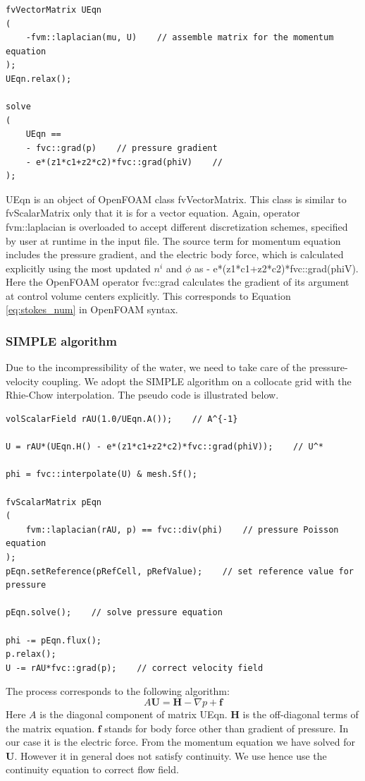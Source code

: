 \begin{lstlisting}
fvVectorMatrix UEqn
(
    -fvm::laplacian(mu, U)    // assemble matrix for the momentum equation
);
UEqn.relax();

solve
(
    UEqn == 
	- fvc::grad(p)    // pressure gradient 
	- e*(z1*c1+z2*c2)*fvc::grad(phiV)    //
);
\end{lstlisting}

\textsf{UEqn} is an object of OpenFOAM class \textsf{fvVectorMatrix}. This class is similar to \textsf{fvScalarMatrix} only that it is for a vector equation. Again, operator \textsf{fvm::laplacian} is overloaded to accept different discretization schemes, specified by user at runtime in the input file. The source term for momentum equation includes the pressure gradient, and the electric body force, which is calculated explicitly using the most updated $n^i$ and $\phi$ as \textsf{- e*(z1*c1+z2*c2)*fvc::grad(phiV)}. Here the OpenFOAM operator \textsf{fvc::grad} calculates the gradient of its argument at control volume centers explicitly. This corresponds to Equation \ref{eq:stokes_num} in OpenFOAM syntax.

\subsubsection{SIMPLE algorithm}
Due to the incompressibility of the water, we need to take care of the pressure-velocity coupling. We adopt the SIMPLE algorithm on a collocate grid with the Rhie-Chow interpolation. The pseudo code is illustrated below.

\begin{lstlisting}
volScalarField rAU(1.0/UEqn.A());    // A^{-1}

U = rAU*(UEqn.H() - e*(z1*c1+z2*c2)*fvc::grad(phiV));    // U^*
    
phi = fvc::interpolate(U) & mesh.Sf();    

fvScalarMatrix pEqn
(
    fvm::laplacian(rAU, p) == fvc::div(phi)    // pressure Poisson equation
);
pEqn.setReference(pRefCell, pRefValue);    // set reference value for pressure

pEqn.solve();    // solve pressure equation

phi -= pEqn.flux();
p.relax();
U -= rAU*fvc::grad(p);    // correct velocity field
\end{lstlisting}

The process corresponds to the following algorithm:
\begin{equation}
A \mathbf{U} = \mathbf{H} - \nabla p + \mathbf{f}
\label{eq:SIMPLE1}
\end{equation}
Here $A$ is the diagonal component of matrix \textsf{UEqn}. $\mathbf{H}$ is the off-diagonal terms of the matrix equation. $\mathbf{f}$ stands for body force other than gradient of pressure. In our case it is the electric force. From the momentum equation we have solved for $\mathbf{U}$. However it in general does not satisfy continuity. We use hence use the continuity equation to correct flow field.

